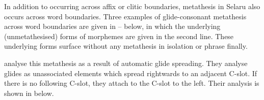 In addition to occurring across affix or clitic boundaries, 
metathesis in Selaru also occurs across word boundaries.
Three examples of glide-consonant metathesis across word boundaries
are given in -- below,
in which the underlying (unmetathesised) forms
of morphemes are given in the second line.
These underlying forms surface without any
metathesis in isolation or phrase finally.

\begin{exe}
\let\eachwordone=\it
	\label{ex:ThaIsjou}
	\label{ex:OurFatIs}
\end{exe}

\cite{coco00} analyse this metathesis as a result of automatic glide spreading.
They analyse glides as unassociated elements which spread rightwards to an adjacent C-slot.
If there is no following C-slot, they attach to the C-slot to the left.
Their analysis is shown in  below.

